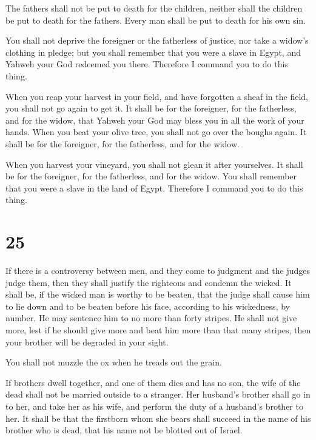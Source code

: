  The fathers shall not be put to death for the children,
neither shall the children be put to death for the fathers. Every man
shall be put to death for his own sin.

 You shall not deprive the foreigner or the fatherless of
justice, nor take a widow's clothing in pledge;  but you
shall remember that you were a slave in Egypt, and Yahweh your God
redeemed you there. Therefore I command you to do this thing.

 When you reap your harvest in your field, and have
forgotten a sheaf in the field, you shall not go again to get it. It
shall be for the foreigner, for the fatherless, and for the widow, that
Yahweh your God may bless you in all the work of your hands.
 When you beat your olive tree, you shall not go over the
boughs again. It shall be for the foreigner, for the fatherless, and for
the widow.

 When you harvest your vineyard, you shall not glean it
after yourselves. It shall be for the foreigner, for the fatherless, and
for the widow.  You shall remember that you were a slave
in the land of Egypt. Therefore I command you to do this thing.

\hypertarget{section-24}{%
\section{25}\label{section-24}}

 If there is a controversy between men, and they come to
judgment and the judges judge them, then they shall justify the
righteous and condemn the wicked.  It shall be, if the
wicked man is worthy to be beaten, that the judge shall cause him to lie
down and to be beaten before his face, according to his wickedness, by
number.  He may sentence him to no more than forty
stripes. He shall not give more, lest if he should give more and beat
him more than that many stripes, then your brother will be degraded in
your sight.

 You shall not muzzle the ox when he treads out the grain.

 If brothers dwell together, and one of them dies and has
no son, the wife of the dead shall not be married outside to a stranger.
Her husband's brother shall go in to her, and take her as his wife, and
perform the duty of a husband's brother to her.  It shall
be that the firstborn whom she bears shall succeed in the name of his
brother who is dead, that his name not be blotted out of Israel.


